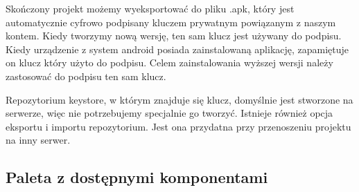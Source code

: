 Skończony projekt możemy wyeksportować do pliku .apk, który jest automatycznie cyfrowo podpisany kluczem prywatnym powiązanym z naszym kontem. Kiedy tworzymy nową wersję, ten sam klucz jest używany do podpisu. Kiedy urządzenie z system android posiada zainstalowaną aplikację, zapamiętuje on klucz który użyto do podpisu. Celem zainstalowania wyższej wersji należy zastosować do podpisu ten sam klucz. 

Repozytorium keystore, w którym znajduje się klucz, domyślnie jest stworzone na serwerze, więc nie potrzebujemy specjalnie go tworzyć. Istnieje również opcja eksportu i importu repozytorium. Jest ona przydatna przy przenoszeniu projektu na inny serwer.

\subsection{Paleta z dostępnymi komponentami}

